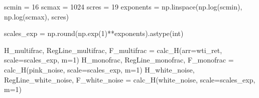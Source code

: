 \documentclass[
  letterpaper,
]{report}
\newenvironment{Shaded}{\begin{snugshade}}{\end{snugshade}}
\newcommand{\BuiltInTok}[1]{\textcolor[rgb]{0.00,0.23,0.31}{#1}}
\newcommand{\DecValTok}[1]{\textcolor[rgb]{0.68,0.00,0.00}{#1}}
\newcommand{\NormalTok}[1]{\textcolor[rgb]{0.00,0.23,0.31}{#1}}
\newcommand{\OperatorTok}[1]{\textcolor[rgb]{0.37,0.37,0.37}{#1}}
\begin{document}
\begin{Shaded}
\begin{Highlighting}[]
\NormalTok{scmin }\OperatorTok{=} \DecValTok{16}
\NormalTok{scmax }\OperatorTok{=} \DecValTok{1024}
\NormalTok{scres }\OperatorTok{=} \DecValTok{19}
\NormalTok{exponents }\OperatorTok{=}\NormalTok{ np.linspace(np.log(scmin), np.log(scmax), scres)}

\NormalTok{scales\_exp }\OperatorTok{=}\NormalTok{ np.}\BuiltInTok{round}\NormalTok{(np.exp(}\DecValTok{1}\NormalTok{)}\OperatorTok{**}\NormalTok{exponents).astype(}\BuiltInTok{int}\NormalTok{)}

\NormalTok{H\_multifrac, RegLine\_multifrac, F\_multifrac }\OperatorTok{=}\NormalTok{ calc\_H(arr}\OperatorTok{=}\NormalTok{wti\_ret, scale}\OperatorTok{=}\NormalTok{scales\_exp, m}\OperatorTok{=}\DecValTok{1}\NormalTok{)}
\NormalTok{H\_monofrac, RegLine\_monofrac, F\_monofrac }\OperatorTok{=}\NormalTok{ calc\_H(pink\_noise, scale}\OperatorTok{=}\NormalTok{scales\_exp, m}\OperatorTok{=}\DecValTok{1}\NormalTok{)}
\NormalTok{H\_white\_noise, RegLine\_white\_noise, F\_white\_noise }\OperatorTok{=}\NormalTok{ calc\_H(white\_noise, scale}\OperatorTok{=}\NormalTok{scales\_exp, m}\OperatorTok{=}\DecValTok{1}\NormalTok{)}
\end{Highlighting}
\end{Shaded}
\end{document}
